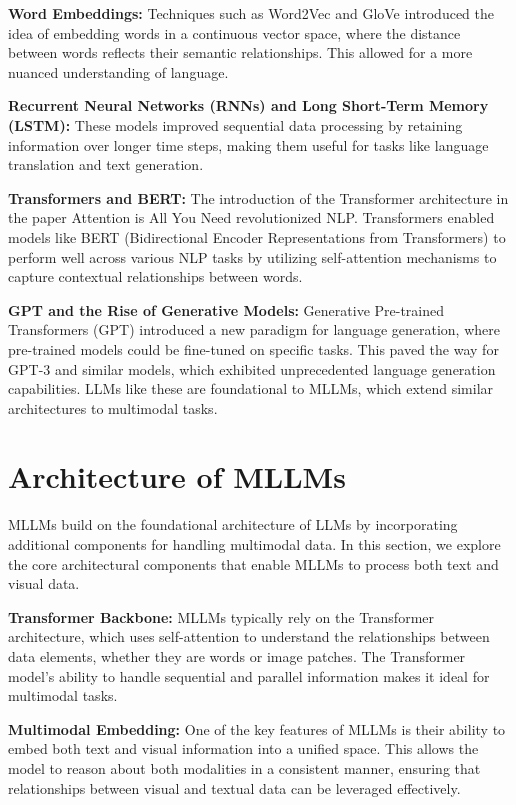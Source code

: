 \textbf{Word Embeddings:} Techniques such as Word2Vec and GloVe introduced the idea of embedding words in a continuous vector space, where the distance between words reflects their semantic relationships. This allowed for a more nuanced understanding of language.

\textbf{Recurrent Neural Networks (RNNs) and Long Short-Term Memory (LSTM):} These models improved sequential data processing by retaining information over longer time steps, making them useful for tasks like language translation and text generation.

\textbf{Transformers and BERT:} The introduction of the Transformer architecture in the paper Attention is All You Need revolutionized NLP. Transformers enabled models like BERT (Bidirectional Encoder Representations from Transformers) to perform well across various NLP tasks by utilizing self-attention mechanisms to capture contextual relationships between words.

\textbf{GPT and the Rise of Generative Models:} Generative Pre-trained Transformers (GPT) introduced a new paradigm for language generation, where pre-trained models could be fine-tuned on specific tasks. This paved the way for GPT-3 and similar models, which exhibited unprecedented language generation capabilities. LLMs like these are foundational to MLLMs, which extend similar architectures to multimodal tasks.

\section{Architecture of MLLMs}

MLLMs build on the foundational architecture of LLMs by incorporating additional components for handling multimodal data. In this section, we explore the core architectural components that enable MLLMs to process both text and visual data.

\textbf{Transformer Backbone:} MLLMs typically rely on the Transformer architecture, which uses self-attention to understand the relationships between data elements, whether they are words or image patches. The Transformer model’s ability to handle sequential and parallel information makes it ideal for multimodal tasks.

\textbf{Multimodal Embedding:} One of the key features of MLLMs is their ability to embed both text and visual information into a unified space. This allows the model to reason about both modalities in a consistent manner, ensuring that relationships between visual and textual data can be leveraged effectively.

